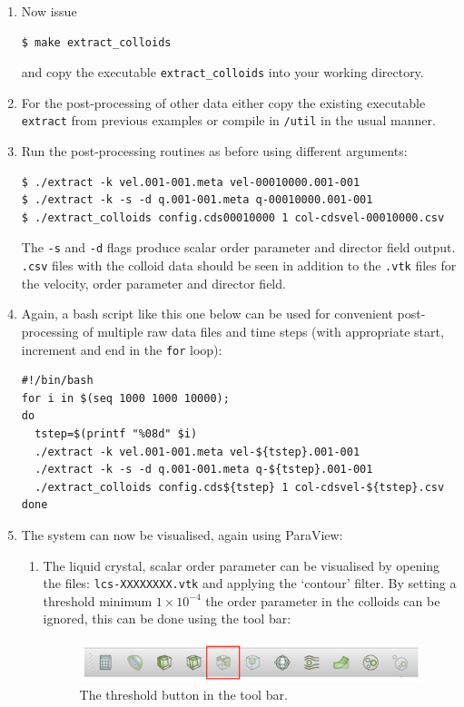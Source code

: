 \documentclass[11pt,twoside,a4paper]{article}
\begin{document}
\begin{enumerate}
\begin{enumerate}
\end{enumerate}
\item Now issue
\begin{lstlisting}
$ make extract_colloids
\end{lstlisting}
and copy the executable \texttt{extract\_colloids} into your working directory.
\item For the post-processing of other data either copy the existing executable \texttt{extract} from 
previous examples or compile in \texttt{/util} in the usual manner.
\item Run the post-processing routines as before using different arguments:
\begin{lstlisting}
$ ./extract -k vel.001-001.meta vel-00010000.001-001
$ ./extract -k -s -d q.001-001.meta q-00010000.001-001
$ ./extract_colloids config.cds00010000 1 col-cdsvel-00010000.csv
\end{lstlisting}
The \texttt{-s} and \texttt{-d} flags produce scalar order parameter and director field output.
\texttt{.csv} files with the colloid data should 
be seen in addition to the \texttt{.vtk} files for the velocity, order parameter and director field.
\item Again, a bash script like this one below can be used for convenient post-processing of multiple raw data files and time steps (with appropriate start, increment and end in the \texttt{for} loop):
\begin{lstlisting}
#!/bin/bash
for i in $(seq 1000 1000 10000);
do
  tstep=$(printf "%08d" $i)
  ./extract -k vel.001-001.meta vel-${tstep}.001-001  
  ./extract -k -s -d q.001-001.meta q-${tstep}.001-001
  ./extract_colloids config.cds${tstep} 1 col-cdsvel-${tstep}.csv
done
\end{lstlisting}
\item The system can now be visualised, again using ParaView:
\begin{enumerate}
\item The liquid crystal, scalar order parameter can be visualised by opening the files: 
\texttt{lcs-XXXXXXXX.vtk} and applying the `contour' filter. By setting a threshold 
minimum $1 \times 10^{-4}$ the order parameter in the colloids can be ignored, this can be done using the tool bar:

\begin{figure}[H]
\begin{center}
\includegraphics[width=0.8\linewidth]{thresh.png}
  \caption{The threshold button in the tool bar.}
  \label{fig:thresh}
  \end{center}
\end{figure}


\end{enumerate}
\end{enumerate}
\end{document}
